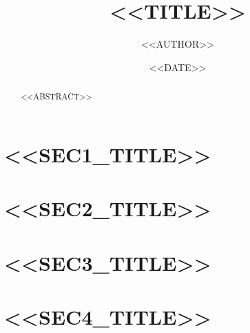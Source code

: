 \documentclass[11pt,a4paper]{article}
\title{\textbf{<<TITLE>>}}
\author{<<AUTHOR>>}
\date{<<DATE>>}
\begin{document}
\maketitle

\begin{abstract}
\noindent
<<ABSTRACT>>
\end{abstract}

\tableofcontents
\newpage

\section{<<SEC1_TITLE>>}
\label{sec:introduction}



\section{<<SEC2_TITLE>>}
\label{sec:related-work}



\section{<<SEC3_TITLE>>}
\label{sec:objectives}



\section{<<SEC4_TITLE>>}
\label{sec:methodology}



\end{document}
